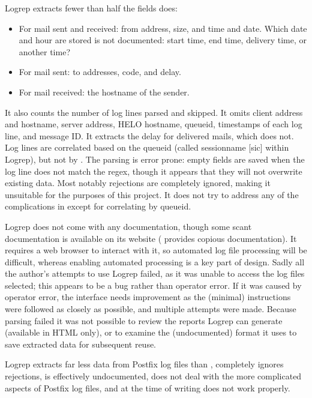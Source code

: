 Logrep extracts fewer than half the fields \parsername{} does:

\begin{itemize}

    \item For mail sent and received: from address, size, and time and
        date.  Which date and hour are stored is not documented: start
        time, end time, delivery time, or another time?

    \item For mail sent: to addresses,  code, and delay.

    \item For mail received: the hostname of the sender.

\end{itemize}

It also counts the number of log lines parsed and skipped.  It omits client
 address and hostname, server  address, HELO
hostname, queueid, timestamps of each log line, and message ID\@.  It
extracts the delay for delivered mails, which \parsername{} does not.  Log
lines are correlated based on the queueid (called sessionname [sic] within
Logrep), but not by .  The parsing is error prone: empty
fields are saved when the log line does not match the regex, though it
appears that they will not overwrite existing data.  Most notably
rejections are completely ignored, making it unsuitable for the purposes of
this project.  It does not try to address any of the complications in
 except for correlating by queueid.

Logrep does not come with any documentation, though some scant
documentation is available on its website (\parsername{} provides copious
documentation).  It requires a web browser to interact with it, so
automated log file processing will be difficult, whereas enabling automated
processing is a key part of \parsernames{} design.  Sadly all the author's
attempts to use Logrep failed, as it was unable to access the log files
selected; this appears to be a bug rather than operator error.  If it was
caused by operator error, the interface needs improvement as the (minimal)
instructions were followed as closely as possible, and multiple attempts
were made.  Because parsing failed it was not possible to review the
reports Logrep can generate (available in HTML only), or to examine the
(undocumented) format it uses to save extracted data for subsequent reuse.

Logrep extracts far less data from Postfix log files than \parsername{},
completely ignores rejections, is effectively undocumented, does not deal
with the more complicated aspects of Postfix log files, and at the time of
writing does not work properly.

